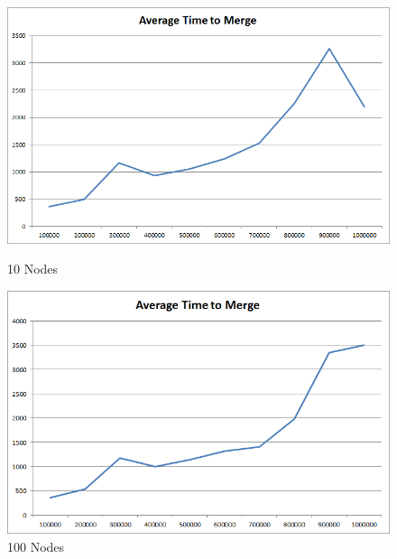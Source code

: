 \begin{figure}[ht]
\begin{minipage}[b]{0.45\linewidth}
\centering
\includegraphics[width=\textwidth]{media/chapter5/perf/mergebignodetest_10.png}
\caption{10 Nodes}
\label{fig:pic1}
\end{minipage}
\hspace{0.5cm}
\begin{minipage}[b]{0.45\linewidth}
\centering
\includegraphics[width=\textwidth]{media/chapter5/perf/mergebignodetest_100.png}
\caption{100 Nodes}
\label{fig:pic2}
\end{minipage}


\end{figure}
